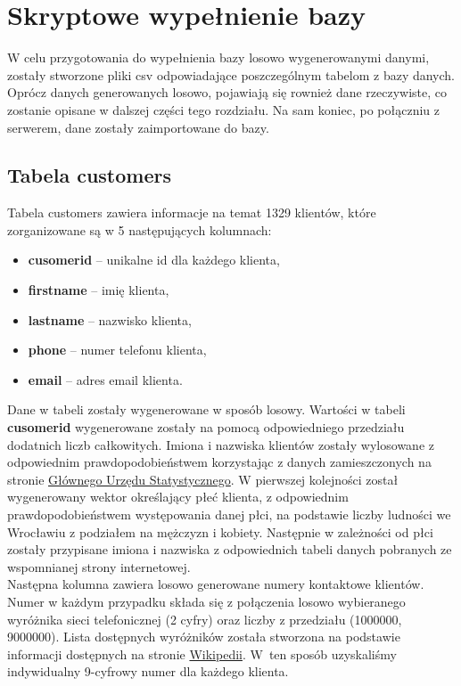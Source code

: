 \documentclass{article}
\begin{document}
	\section{Skryptowe wypełnienie bazy}
	
	W celu przygotowania do wypełnienia bazy losowo wygenerowanymi danymi, zostały stworzone pliki csv odpowiadające poszczególnym tabelom z bazy danych. Oprócz danych generowanych losowo, pojawiają się rownież dane rzeczywiste, co zostanie opisane w dalszej części tego rozdziału. Na sam koniec, po połączniu z serwerem, dane zostały zaimportowane do bazy.
	
	\subsection{Tabela customers}
		Tabela customers zawiera informacje na temat 1329 klientów, które zorganizowane są w  5 następujących kolumnach:
		\begin{itemize}
			\setlength{\itemsep}{-2pt}
			\item \textbf{cusomer\textunderscore id} – unikalne id dla każdego klienta,
			\item \textbf{first\textunderscore name} – imię klienta,
			\item \textbf{last\textunderscore name} – nazwisko klienta,
			\item \textbf{phone} – numer telefonu klienta,
			\item \textbf{email} – adres email klienta.
		\end{itemize}
		
		\noindent Dane w tabeli zostały wygenerowane w sposób losowy. Wartości w tabeli \textbf{cusomer\textunderscore id} wygenerowane zostały na pomocą odpowiedniego przedziału  dodatnich liczb całkowitych. Imiona i nazwiska klientów zostały wylosowane z odpowiednim prawdopodobieństwem korzystając z danych zamieszczonych na stronie \href{https://stat.gov.pl/}{Głównego Urzędu Statystycznego}. W pierwszej kolejności został wygenerowany wektor określający płeć klienta, z odpowiednim prawdopodobieństwem występowania danej płci, na podstawie liczby ludności we Wrocławiu z podziałem na mężczyzn i kobiety. Następnie w zależności od płci zostały przypisane imiona i nazwiska z odpowiednich tabeli danych pobranych ze wspomnianej strony internetowej.\\
		
		\noindent Następna kolumna zawiera losowo generowane numery kontaktowe klientów. Numer w każdym przypadku składa się z połączenia losowo wybieranego wyróżnika sieci telefonicznej (2 cyfry) oraz liczby z przedziału (1000000, 9000000). Lista dostępnych wyróżników została stworzona na podstawie informacji dostępnych na stronie \href{https://pl.wikipedia.org/wiki/Numery_telefoniczne_w_Polsce}{Wikipedii}. W~ten sposób uzyskaliśmy indywidualny 9-cyfrowy numer dla każdego klienta.\\
		
\end{document}
